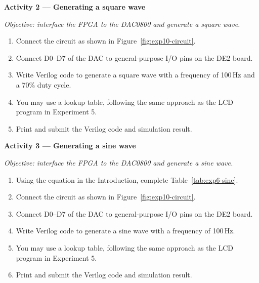 \begin{procedure}
  \textbf{Activity 2 --- Generating a square wave}\vspace{2pt}

  \textit{Objective: interface the FPGA to the DAC0800 and generate a square wave.}

  \begin{enumerate}
    \item Connect the circuit as shown in Figure~\ref{fig:exp10-circuit}.
    \item Connect D0--D7 of the DAC to general-purpose I/O pins on the DE2 board.
    \item Write Verilog code to generate a square wave with a frequency of 100\,Hz and a 70\% duty cycle.
    \item You may use a lookup table, following the same approach as the LCD program in Experiment 5.
    \item Print and submit the Verilog code and simulation result.
  \end{enumerate}

  \textbf{Activity 3 --- Generating a sine wave}\vspace{2pt}

  \textit{Objective: interface the FPGA to the DAC0800 and generate a sine wave.}

  \begin{enumerate}
    \item Using the equation in the Introduction, complete Table~\ref{tab:exp6-sine}.
    \item Connect the circuit as shown in Figure~\ref{fig:exp10-circuit}.
    \item Connect D0--D7 of the DAC to general-purpose I/O pins on the DE2 board.
    \item Write Verilog code to generate a sine wave with a frequency of 100\,Hz.
    \item You may use a lookup table, following the same approach as the LCD program in Experiment 5.
    \item Print and submit the Verilog code and simulation result.
  \end{enumerate}


\end{procedure}
